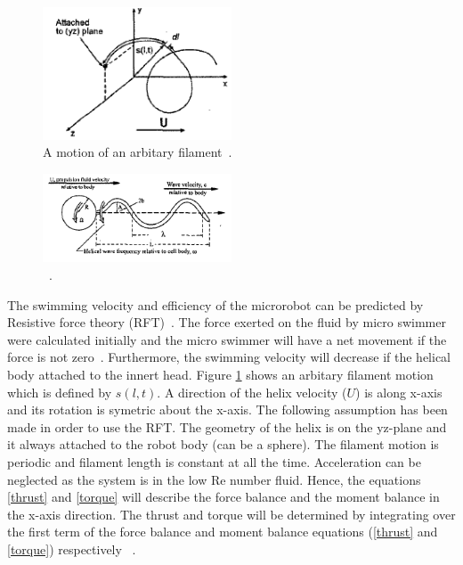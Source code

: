 \documentclass[12pt,a4paper,titlepage]{report}
\begin{document}
\begin{figure}
  \begin{center}
    \includegraphics[width=0.5\textwidth]{filament}
  \caption{A motion of an arbitary filament~\citep{edd2003biomimetic}.}
  \label{filament}
\end{center}
\end{figure}


\begin{figure}
  \begin{center}
    \includegraphics[width=0.5\textwidth]{motion}
  \caption{~\citep{edd2003biomimetic}.}
  \label{motion}
\end{center}
\end{figure}



The swimming velocity and efficiency of the microrobot can be predicted by Resistive force theory (RFT)~\citep{purcell1997efficiency}. 
The force exerted on the fluid by micro swimmer were calculated initially and the micro swimmer will have a net 
movement if the force is not zero~\citep{Doe:2013:Online}. Furthermore, the swimming velocity will decrease if the helical
body attached to the innert head. Figure \ref{filament} shows an arbitary filament motion which is defined by $s(l,t)$. 
A direction of the helix velocity ($U$) is along x-axis and its rotation is symetric about the x-axis. 
The following assumption has been made in order to use the RFT. The geometry
of the helix is on the yz-plane and it always attached to the robot body (can be a sphere). The 
filament motion is periodic and filament length is constant at all the time. Acceleration can be neglected as the
system is in the low Re number fluid. Hence, the equations \ref{thrust} and \ref{torque} will describe the force balance and 
the moment balance in the x-axis direction. The thrust and torque will be determined by integrating over the 
first term of the force balance and moment balance equations (\ref{thrust} and \ref{torque}) 
 respectively ~\citep{edd2003biomimetic}.
\end{document}
